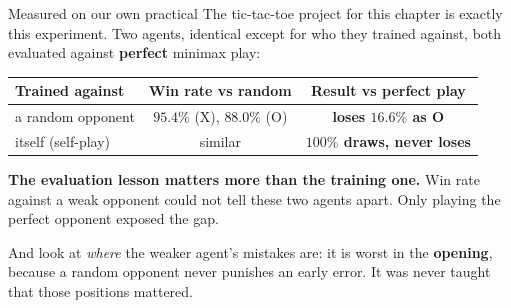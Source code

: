 \documentclass[aspectratio=169]{beamer}
\begin{document}
\begin{frame}{Measured on our own practical}
  \small
  The tic-tac-toe project for this chapter is exactly this experiment. Two agents, identical
  except for who they trained against, both evaluated against \textbf{perfect} minimax play:

  \vskip 8pt
  \begin{center}
  \footnotesize
  \begin{tabular}{l c c}
    \toprule
    \textbf{Trained against} & \textbf{Win rate vs random} & \textbf{Result vs perfect play} \\
    \midrule
    a random opponent & $95.4\%$ (X), $88.0\%$ (O) & \textbf{loses $16.6\%$ as O} \\
    itself (self-play) & similar & \textbf{$100\%$ draws, never loses} \\
    \bottomrule
  \end{tabular}
  \end{center}

  \vskip 8pt
  \begin{tcolorbox}[colback=armorange!12, colframe=armorange, boxrule=0.7pt, arc=2pt]
    \small
    \textbf{The evaluation lesson matters more than the training one.} Win rate against a weak
    opponent could not tell these two agents apart. Only playing the perfect opponent exposed
    the gap.

    \vskip 4pt
    And look at \emph{where} the weaker agent's mistakes are: it is worst in the \textbf{opening},
    because a random opponent never punishes an early error. It was never taught that those
    positions mattered.
  \end{tcolorbox}
\end{frame}
\end{document}
